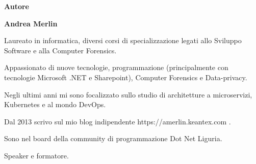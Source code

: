 \begin{titlepage}
\thispagestyle{empty}
\vspace*{3cm}

\begin{center}
{\Large\bfseries Autore}

\vspace{1.5cm}

{\huge\bfseries Andrea Merlin}
\end{center}

\vspace{2cm}

\noindent Laureato in informatica, diversi corsi di specializzazione legati allo Sviluppo Software e alla Computer Forensics.

\medskip

Appassionato di nuove tecnologie, programmazione (principalmente con tecnologie Microsoft .NET e Sharepoint), Computer Forensics e Data-privacy.

\medskip

Negli ultimi anni mi sono focalizzato sullo studio di architetture a microservizi, Kubernetes e al mondo DevOps.

\medskip

Dal 2013 scrivo sul mio blog indipendente https://amerlin.keantex.com . 

\medskip
Sono nel board della community di programmazione Dot Net Liguria.

\medskip
Speaker e formatore.

\vfill
\end{titlepage}
